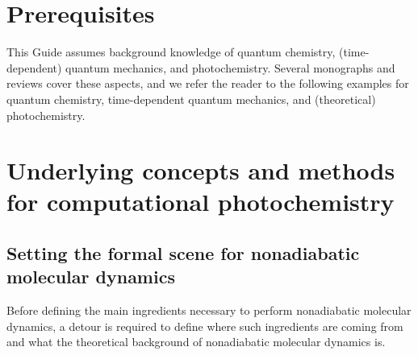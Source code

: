 \documentclass[9pt,bestpractices]{livecoms}
\begin{document}
\section{Prerequisites}

This Guide assumes background knowledge of quantum chemistry, (time-dependent) quantum mechanics, and photochemistry. Several monographs and reviews cover these aspects, and we refer the reader to the following examples for quantum chemistry,\cite{mcquarrie2008quantum,atkins2011molecular,szabo1989modern,tddftcarsten} time-dependent quantum mechanics,\cite{schatz2002quantum,tannor_book} and (theoretical) photochemistry.\cite{turro2009principles,michl,persico2018photochemistry} 

\section{Underlying concepts and methods for computational photochemistry}
\subsection{Setting the formal scene for nonadiabatic molecular dynamics}
Before defining the main ingredients necessary to perform nonadiabatic molecular dynamics, a detour is required to define where such ingredients are coming from and what the theoretical background of nonadiabatic molecular dynamics is.
\end{document}
